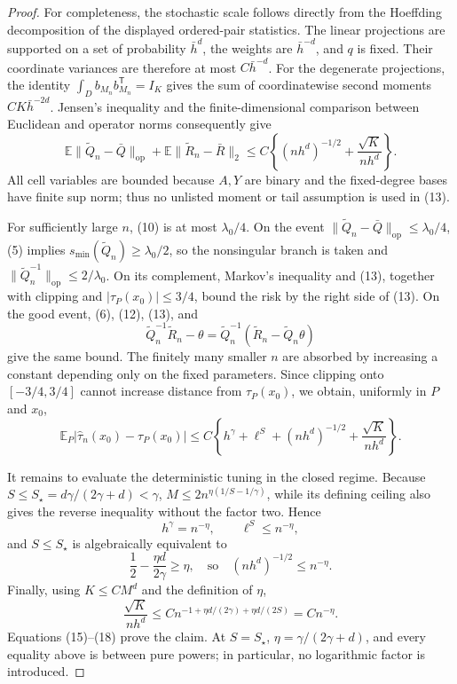 \documentclass{article}
\begin{document}
\begin{proof}
For completeness, the stochastic scale follows directly from the Hoeffding decomposition of the displayed ordered-pair statistics.  The linear projections are supported on a set of probability \(\bar h^d\), the weights are \(\bar h^{-d}\), and \(q\) is fixed.  Their coordinate variances are therefore at most \(C\bar h^{-d}\).  For the degenerate projections, the identity \(\int_D b_{M_n}b_{M_n}^{\mathsf T}=I_K\) gives the sum of coordinatewise second moments \(C K\bar h^{-2d}\).  Jensen's inequality and the finite-dimensional comparison between Euclidean and operator norms consequently give
\[
 \mathbb E\|\widetilde Q_n-\bar Q\|_{\mathrm{op}}
 +\mathbb E\|\widetilde R_n-\bar R\|_2
 \le C\left\{(nh^d)^{-1/2}+\frac{\sqrt K}{nh^d}\right\}.          \tag{13}
\]
All cell variables are bounded because \(A,Y\) are binary and the fixed-degree bases have finite sup norm; thus no unlisted moment or tail assumption is used in (13).

For sufficiently large \(n\), (10) is at most \(\lambda_0/4\).  On the event \(\|\widetilde Q_n-\bar Q\|_{\mathrm{op}}\le\lambda_0/4\), (5) implies \(s_{\min}(\widetilde Q_n)\ge\lambda_0/2\), so the nonsingular branch is taken and \(\|\widetilde Q_n^{-1}\|_{\mathrm{op}}\le2/\lambda_0\).  On its complement, Markov's inequality and (13), together with clipping and \(|\tau_P(x_0)|\le3/4\), bound the risk by the right side of (13).  On the good event, (6), (12), (13), and
\[
 \widetilde Q_n^{-1}\widetilde R_n-\theta
 =\widetilde Q_n^{-1}(\widetilde R_n-\widetilde Q_n\theta)           \tag{14}
\]
give the same bound.  The finitely many smaller \(n\) are absorbed by increasing a constant depending only on the fixed parameters.  Since clipping onto \([-3/4,3/4]\) cannot increase distance from \(\tau_P(x_0)\), we obtain, uniformly in \(P\) and \(x_0\),
\[
 \mathbb E_P|\widehat\tau_n(x_0)-\tau_P(x_0)|
 \le C\left\{h^\gamma+\ell^S+(nh^d)^{-1/2}+\frac{\sqrt K}{nh^d}\right\}. \tag{15}
\]

It remains to evaluate the deterministic tuning in the closed regime.  Because \(S\le S_\star=d\gamma/(2\gamma+d)<\gamma\), \(M\le2n^{\eta(1/S-1/\gamma)}\), while its defining ceiling also gives the reverse inequality without the factor two.  Hence
\[
 h^\gamma=n^{-\eta},\qquad
 \ell^S\le n^{-\eta},                                               \tag{16}
\]
and \(S\le S_\star\) is algebraically equivalent to
\[
 \frac12-\frac{\eta d}{2\gamma}\ge\eta,
 \quad\text{so}\quad (nh^d)^{-1/2}\le n^{-\eta}.                  \tag{17}
\]
Finally, using \(K\le C M^d\) and the definition of \(\eta\),
\[
 \frac{\sqrt K}{nh^d}
 \le Cn^{-1+\eta d/(2\gamma)+\eta d/(2S)}
 =Cn^{-\eta}.                                                       \tag{18}
\]
Equations (15)--(18) prove the claim.  At \(S=S_\star\), \(\eta=\gamma/(2\gamma+d)\), and every equality above is between pure powers; in particular, no logarithmic factor is introduced.
\end{proof}
\end{document}
